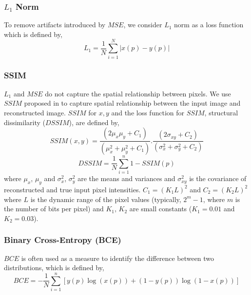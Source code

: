 \subsubsection{$L_1$ Norm}

To remove artifacts introduced by $MSE$, we consider $L_1$ norm as a loss function which is defined by,
\vspace{-0.3cm}
\begin{equation}
L_1 = \frac{1}{N} \sum_{i=1}^{N} |x(p)-y(p)|
\label{mae}
\end{equation}

\vspace{-0.9cm}
\subsubsection{SSIM}
$L_1$ and $MSE$ do not capture the spatial relationship between pixels. We use $SSIM$ proposed in \cite{Wang:2004:IQA:2319031.2320551} to capture spatial relationship between the input image and reconstructed image. $SSIM$ for $x,y$ and the loss function for $SSIM$, structural dissimilarity ($DSSIM$), are defined by,
\vspace{-0.1cm}
\begin{equation}
SSIM(x,y) = \frac{(2\mu_x\mu_y + C_1)} {(\mu_x^2 + \mu_y^2+C_1)} .\frac{ (2 \sigma _{xy} + C_2)} {(\sigma_x^2 + \sigma_y^2+C_2)}
\label{ssim}
\end{equation}
\vspace{-0.3cm}
\begin{equation}
DSSIM = \frac{1}{N} \sum_{i=1}^{n} 1- SSIM(p)
\label{dssim}
\end{equation}
where $\mu_x$, $\mu_y$ and $\sigma_x^2$, $\sigma_y^2$ are the means and variances and $\sigma _{xy}^2$ is the covariance of reconstructed and true input pixel intensities.
$C_1=(K_1L)^2$ and $C_2=(K_2L)^2$ where $L$ is the dynamic range of the pixel values (typically, $2^m -1$, where $m$ is the number of bits per pixel) and $K_1$, $K_2$ are small constants ($K_1=0.01$ and $K_2=0.03$).

\vspace{-0.3cm}
\subsubsection{Binary Cross-Entropy (BCE)}
$BCE$ is often used as a measure to identify the difference between two distributions, which is defined by,
\vspace{-0.3cm}
\begin{equation}
BCE = - \frac{1}{N} \sum_{i=1}^{n} [y(p)\log(x(p)) + (1-y(p))\log(1-x(p))]
\label{bce}
\end{equation}

